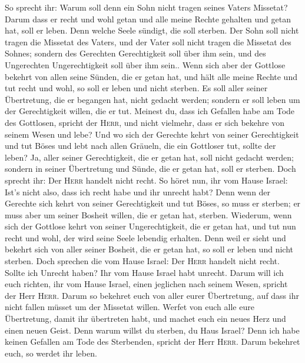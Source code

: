  So sprecht ihr: Warum soll denn ein Sohn nicht tragen
seines Vaters Missetat? Darum dass er recht und wohl getan und alle
meine Rechte gehalten und getan hat, soll er leben.  Denn
welche Seele sündigt, die soll sterben. Der Sohn soll nicht tragen die
Missetat des Vaters, und der Vater soll nicht tragen die Missetat des
Sohnes; sondern des Gerechten Gerechtigkeit soll über ihm sein, und des
Ungerechten Ungerechtigkeit soll über ihm sein..  Wenn
sich aber der Gottlose bekehrt von allen seine Sünden, die er getan hat,
und hält alle meine Rechte und tut recht und wohl, so soll er leben und
nicht sterben.  Es soll aller seiner Übertretung, die er
begangen hat, nicht gedacht werden; sondern er soll leben um der
Gerechtigkeit willen, die er tut.  Meinest du, dass ich
Gefallen habe am Tode des Gottlosen, spricht der \textsc{Herr}, und
nicht vielmehr, dass er sich bekehre von seinem Wesen und lebe?
 Und wo sich der Gerechte kehrt von seiner Gerechtigkeit
und tut Böses und lebt nach allen Gräueln, die ein Gottloser tut, sollte
der leben? Ja, aller seiner Gerechtigkeit, die er getan hat, soll nicht
gedacht werden; sondern in seiner Übertretung und Sünde, die er getan
hat, soll er sterben.  Doch sprecht ihr: Der
\textsc{Herr} handelt nicht recht. So höret nun, ihr vom Hause Israel:
Ist's nicht also, dass ich recht habe und ihr unrecht habt?
 Denn wenn der Gerechte sich kehrt von seiner
Gerechtigkeit und tut Böses, so muss er sterben; er muss aber um seiner
Bosheit willen, die er getan hat, sterben.  Wiederum,
wenn sich der Gottlose kehrt von seiner Ungerechtigkeit, die er getan
hat, und tut nun recht und wohl, der wird seine Seele lebendig erhalten.
 Denn weil er sieht und bekehrt sich von aller seiner
Bosheit, die er getan hat, so soll er leben und nicht sterben.
 Doch sprechen die vom Hause Israel: Der \textsc{Herr}
handelt nicht recht. Sollte ich Unrecht haben? Ihr vom Hause Israel habt
unrecht.  Darum will ich euch richten, ihr vom Hause
Israel, einen jeglichen nach seinem Wesen, spricht der Herr
\textsc{Herr}. Darum so bekehret euch von aller eurer Übertretung, auf
dass ihr nicht fallen müsset um der Missetat willen. 
Werfet von euch alle eure Übertretung, damit ihr übertreten habt, und
machet euch ein neues Herz und einen neuen Geist. Denn warum willst du
sterben, du Haus Israel?  Denn ich habe keinen Gefallen
am Tode des Sterbenden, spricht der Herr \textsc{Herr}. Darum bekehret
euch, so werdet ihr leben.

